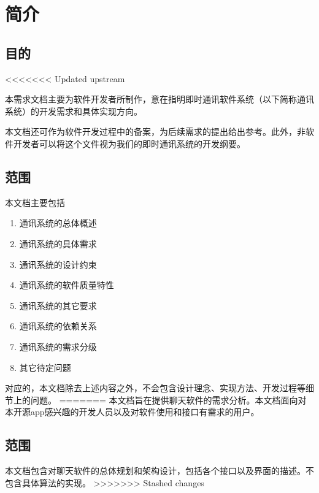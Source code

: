 \chapter{简介}
\section{目的}
<<<<<<< Updated upstream


本需求文档主要为软件开发者所制作，意在指明即时通讯软件系统（以下简称通讯系统）的开发需求和具体实现方向。

本文档还可作为软件开发过程中的备案，为后续需求的提出给出参考。此外，非软件开发者可以将这个文件视为我们的即时通讯系统的开发纲要。

\section{范围}


本文档主要包括
\begin{enumerate}
	\item 通讯系统的总体概述
	
	\item 通讯系统的具体需求
	
	\item 通讯系统的设计约束
	
	\item 通讯系统的软件质量特性
	
	\item 通讯系统的其它要求
	
	\item 通讯系统的依赖关系
	
	\item 通讯系统的需求分级
	
	\item 其它待定问题 
\end{enumerate}

对应的，本文档除去上述内容之外，不会包含设计理念、实现方法、开发过程等细节上的问题。
=======
本文档旨在提供聊天软件的需求分析。本文档面向对本开源app感兴趣的开发人员以及对软件使用和接口有需求的用户。

\section{范围}
本文档包含对聊天软件的总体规划和架构设计，包括各个接口以及界面的描述。不包含具体算法的实现。
>>>>>>> Stashed changes
